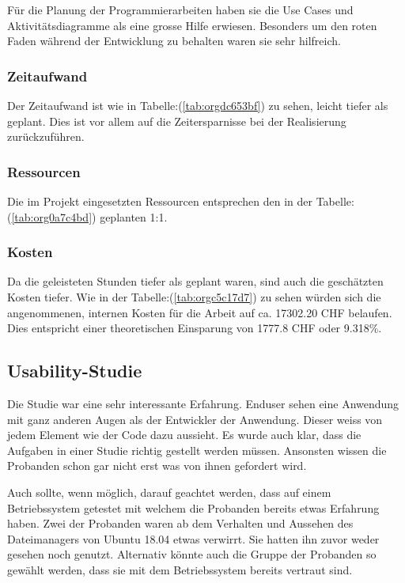 Für die Planung der Programmierarbeiten haben sie die Use Cases und
Aktivitätsdiagramme als eine grosse Hilfe erwiesen. Besonders um den roten Faden
während der Entwicklung zu behalten waren sie sehr hilfreich.

\subsubsection{Zeitaufwand}
\label{sec:orgd0a21b2}

Der Zeitaufwand ist wie in Tabelle:(\ref{tab:orgdc653bf}) zu sehen, leicht tiefer als
geplant. Dies ist vor allem auf die Zeitersparnisse bei der Realisierung
zurückzuführen.

\subsubsection{Ressourcen}
\label{sec:org2b5e3d5}

Die im Projekt eingesetzten Ressourcen entsprechen den in der
Tabelle:(\ref{tab:org0a7c4bd}) geplanten 1:1.

\subsubsection{Kosten}
\label{sec:org30be751}

Da die geleisteten Stunden tiefer als geplant waren, sind auch die geschätzten
Kosten tiefer. Wie in der Tabelle:(\ref{tab:orgc5c17d7}) zu sehen würden sich die
angenommenen, internen Kosten für die Arbeit auf ca. 17302.20 CHF belaufen.
Dies entspricht einer theoretischen Einsparung von 1777.8 CHF oder 9.318\%.

\subsection{Usability-Studie}
\label{sec:orgd81cd12}

Die Studie war eine sehr interessante Erfahrung. Enduser sehen eine Anwendung
mit ganz anderen Augen als der Entwickler der Anwendung. Dieser weiss von jedem
Element wie der Code dazu aussieht. Es wurde auch klar, dass die Aufgaben in
einer Studie richtig gestellt werden müssen. Ansonsten wissen die Probanden
schon gar nicht erst was von ihnen gefordert wird.

Auch sollte, wenn möglich, darauf geachtet werden, dass auf einem Betriebssystem
getestet mit welchem die Probanden bereits etwas Erfahrung haben. Zwei der
Probanden waren ab dem Verhalten und Aussehen des Dateimanagers von Ubuntu
18.04 etwas verwirrt. Sie hatten ihn zuvor weder gesehen noch genutzt.
Alternativ könnte auch die Gruppe der Probanden so gewählt werden, dass sie mit
dem Betriebssystem bereits vertraut sind.

